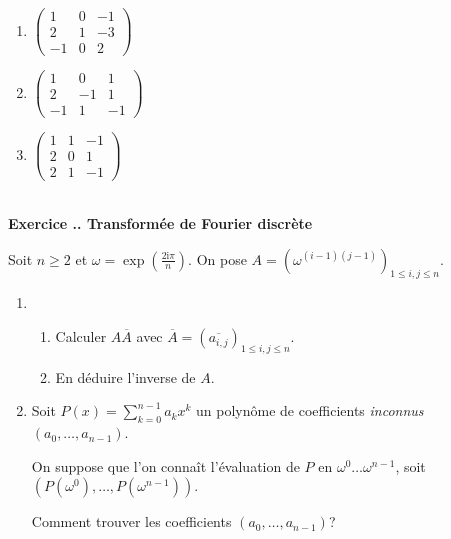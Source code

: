 \documentclass{article}
\newcommand{\im}{\text{i}}
\newcounter{exo}
\newcommand{\exercice}[1][\null]{\textbf{\\ Exercice \thesection.\theexo. #1} \addtocounter{exo}{1}}
\begin{document}
\begin{multicols}{3}

\begin{enumerate}

\item $ \begin{pmatrix} 1 & 0 & -1 \\ 2 & 1 & -3 \\ -1 & 0 & 2 \end{pmatrix}$

\item $ \begin{pmatrix}  1 & 0 & 1 \\ 2 & -1 & 1 \\ -1 & 1 & -1 \end{pmatrix}$

\item $ \begin{pmatrix}  1 & 1 & -1 \\ 2 & 0 & 1 \\ 2 & 1 & -1 \end{pmatrix}$

\end{enumerate}

\end{multicols}





\exercice[Transformée de Fourier discrète]

Soit $n \ge 2$ et $\omega = \exp(\frac{2\im \pi}{n})$. On pose $A = (\omega^{(i-1)(j-1)})_{1 \le i,j \le n}$.

\begin{enumerate}

\item \begin{enumerate}

\item Calculer $A \overline{A}$ avec $\overline{A} = (\overline{a_{i,j}})_{1 \le i,j \le n}$.

\item En déduire l'inverse de $A$.

\end{enumerate}

\item Soit $ P(x) =  \sum_{k=0}^{n-1} a_k x^k$ un polynôme de coefficients \emph{inconnus} $(a_0, \dots, a_{n-1})$.

On suppose que l'on connaît l'évaluation de $P$ en $\omega^0 \dots \omega^{n-1}$, soit $(P(\omega^0), \dots, P(\omega^{n-1}))$.

Comment trouver les coefficients $(a_0, \dots, a_{n-1})$?

\end{enumerate}
\end{document}

